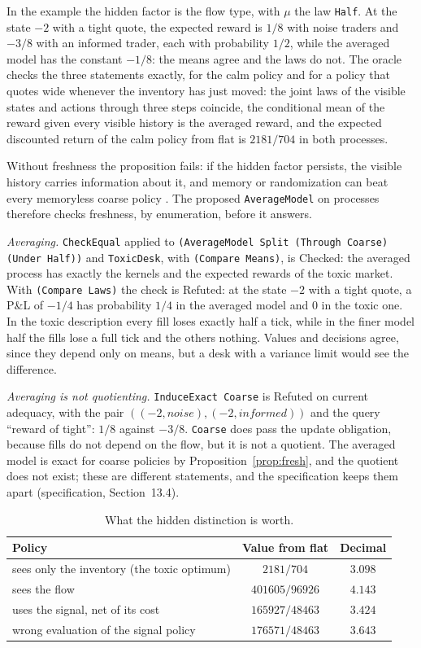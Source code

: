 \documentclass[11pt]{article}
\newcommand{\code}[1]{\texttt{#1}}
\newcommand{\spec}[1]{specification, Section~#1}
\theoremstyle{definition}
\theoremstyle{plain}
\begin{document}
In the example the hidden factor is the flow type, with $\mu$ the law \code{Half}. At the state $-2$
with a tight quote, the expected reward is $1/8$ with noise traders and $-3/8$ with an informed trader,
each with probability $1/2$, while the averaged model has the constant $-1/8$: the means agree and the
laws do not. The oracle checks the three statements exactly, for the calm policy and for a policy that
quotes wide whenever the inventory has just moved: the joint laws of the visible states and actions
through three steps coincide, the conditional mean of the reward given every visible history is the
averaged reward, and the expected discounted return of the calm policy from flat is $2181/704$ in
both processes.

Without freshness the proposition fails: if the hidden factor persists, the visible history carries
information about it, and memory or randomization can beat every memoryless coarse policy
\cite{singhpomdp}. The proposed \code{AverageModel} on processes therefore checks freshness, by
enumeration, before it answers.

\emph{Averaging.} \code{CheckEqual} applied to \code{(AverageModel Split (Through Coarse) (Under Half))}
and \code{ToxicDesk}, with \code{(Compare Means)}, is Checked: the averaged process has exactly the
kernels and the expected rewards of the toxic market. With \code{(Compare Laws)} the check is Refuted: at the state $-2$ with a tight quote, a P\&L of
$-1/4$ has probability $1/4$ in the averaged model and $0$ in the toxic one. In the toxic description
every fill loses exactly half a tick, while in the finer model half the fills lose a full tick and the
others nothing. Values and decisions agree, since they depend only on means, but a desk with a variance
limit would see the difference.

\emph{Averaging is not quotienting.} \code{InduceExact Coarse} is Refuted on current adequacy, with the
pair $((-2,\mathit{noise}),(-2,\mathit{informed}))$ and the query ``reward of tight'': $1/8$ against
$-3/8$. \code{Coarse} does pass the update obligation, because fills do not depend on the flow, but it is
not a quotient. The averaged model is exact for coarse policies by Proposition~\ref{prop:fresh}, and the
quotient does not exist; these are different statements, and the specification keeps them apart
(\spec{13.4}).

\begin{table}[ht]
\centering\small
\begin{tabular}{lcc}
\toprule
Policy & Value from flat & Decimal\\
\midrule
sees only the inventory (the toxic optimum) & $2181/704$ & $3.098$\\
sees the flow & $401605/96926$ & $4.143$\\
uses the signal, net of its cost & $165927/48463$ & $3.424$\\
wrong evaluation of the signal policy & $176571/48463$ & $3.643$\\
\bottomrule
\end{tabular}
\caption{What the hidden distinction is worth.}\label{tab:ex4signal}
\end{table}
\end{document}
